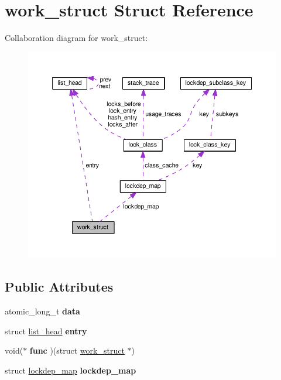 \hypertarget{structwork__struct}{}\section{work\+\_\+struct Struct Reference}
\label{structwork__struct}


Collaboration diagram for work\+\_\+struct\+:
\nopagebreak
\begin{figure}[H]
\begin{center}
\leavevmode
\includegraphics[width=350pt]{structwork__struct__coll__graph}
\end{center}
\end{figure}
\subsection*{Public Attributes}
\begin{DoxyCompactItemize}
\item 
\hypertarget{structwork__struct_a5e75fec18ff915930089faedbac0c6a0}{}atomic\+\_\+long\+\_\+t {\bfseries data}\label{structwork__struct_a5e75fec18ff915930089faedbac0c6a0}

\item 
\hypertarget{structwork__struct_a704ca017e90f73a63f0cccaf4a48efb4}{}struct \hyperlink{structlist__head}{list\+\_\+head} {\bfseries entry}\label{structwork__struct_a704ca017e90f73a63f0cccaf4a48efb4}

\item 
\hypertarget{structwork__struct_ae4d6e07c542f8c84560f8fa8699fd83a}{}void($\ast$ {\bfseries func} )(struct \hyperlink{structwork__struct}{work\+\_\+struct} $\ast$)\label{structwork__struct_ae4d6e07c542f8c84560f8fa8699fd83a}

\item 
\hypertarget{structwork__struct_adb8800f7dd5bd3290c08bb5753c6a8e1}{}struct \hyperlink{structlockdep__map}{lockdep\+\_\+map} {\bfseries lockdep\+\_\+map}\label{structwork__struct_adb8800f7dd5bd3290c08bb5753c6a8e1}

\end{DoxyCompactItemize}


